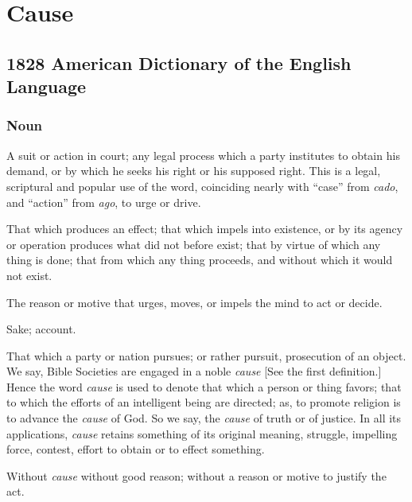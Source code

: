 \section{Cause}
	\label{CAUSE}
	

\subsection{1828 American Dictionary of the English Language} %
	\label{CAUSE-1828}
	
	\subsubsection{Noun}

		\begin{compactitem}
			\item[1] A suit or action in court; any legal process which a party institutes to obtain his demand, or by which he seeks his right or his supposed right. This is a legal, scriptural and popular use of the word, coinciding nearly with ``case'' from \textit{cado}, and ``action'' from \textit{ago}, to urge or drive.
			\item[2] That which produces an effect; that which impels into existence, or by its agency or operation produces what did not before exist; that by virtue of which any thing is done; that from which any thing proceeds, and without which it would not exist.
			\item[3] The reason or motive that urges, moves, or impels the mind to act or decide.
			\item[4] Sake; account.
			\item[5] That which a party or nation pursues; or rather pursuit, prosecution of an object. We say, Bible Societies are engaged in a noble \textit{cause} [See the first definition.] Hence the word \textit{cause} is used to denote that which a person or thing favors; that to which the efforts of an intelligent being are directed; as, to promote religion is to advance the \textit{cause} of God. So we say, the \textit{cause} of truth or of justice. In all its applications, \textit{cause} retains something of its original meaning, struggle, impelling force, contest, effort to obtain or to effect something.
			\item[6] Without \textit{cause} without good reason; without a reason or motive to justify the act.
		\end{compactitem}

